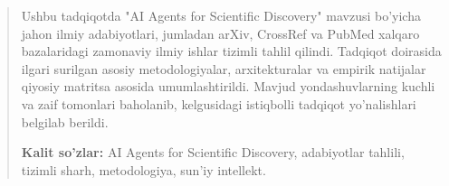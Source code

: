 \begin{abstract}
Ushbu tadqiqotda "AI Agents for Scientific Discovery" mavzusi bo'yicha jahon ilmiy adabiyotlari, jumladan arXiv, CrossRef va PubMed xalqaro bazalaridagi zamonaviy ilmiy ishlar tizimli tahlil qilindi. Tadqiqot doirasida ilgari surilgan asosiy metodologiyalar, arxitekturalar va empirik natijalar qiyosiy matritsa asosida umumlashtirildi. Mavjud yondashuvlarning kuchli va zaif tomonlari baholanib, kelgusidagi istiqbolli tadqiqot yo'nalishlari belgilab berildi.

\textbf{Kalit so'zlar:} AI Agents for Scientific Discovery, adabiyotlar tahlili, tizimli sharh, metodologiya, sun'iy intellekt.
\end{abstract}
